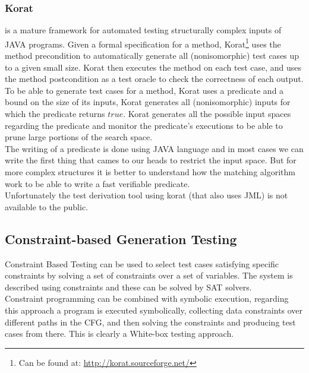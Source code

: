 \documentclass[10pt, conference, compsocconf]{IEEEtran}
\begin{document}
\subsubsection{\textbf{Korat}\cite{Boyapati02korat:automated}}
is a mature framework for automated testing structurally complex inputs of JAVA programs.
Given a formal specification for a method, Korat\footnote{Can be found at: \url{http://korat.sourceforge.net/}} uses the method precondition
to automatically generate all (nonisomorphic) test cases up to a given small size.
Korat then executes the method on each test case, and uses the method postcondition as a test oracle to check the correctness of each output.\\
To be able to generate test cases for a method, Korat uses a predicate and a bound on the size of its inputs,
Korat generates all (nonisomorphic) inputs for which the predicate returns $true$.
Korat generates all the possible input spaces regarding the predicate and monitor the predicate's executions to be able to prune large portions of the search space.\\
\indent The writing of a predicate is done using JAVA language and in most cases we can write the first thing that cames to our heads to restrict the input space.
But for more complex structures it is better to understand how the matching algorithm work to be able to write a fast verifiable predicate.\\
Unfortunately the test derivation tool using korat (that also uses JML) is not available to the public.

\subsection{Constraint-based Generation Testing}
Constraint Based Testing\cite{DeMillo91constraint-basedautomatic} can be used to select test cases satisfying specific constraints by
solving a set of constraints over a set of variables. The system is described using constraints and these can be solved by SAT solvers.\\
Constraint programming can be combined with symbolic execution, regarding this approach a program is executed symbolically,
collecting data constraints over different paths in the CFG, and then solving the constraints and producing test cases from there.
This is clearly a White-box testing approach.
\end{document}
